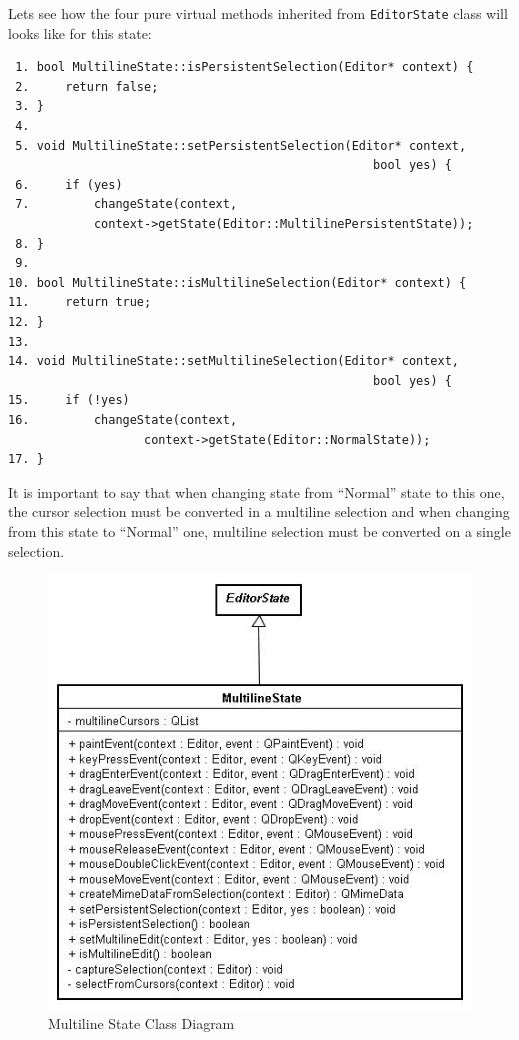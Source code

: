 \documentclass[11pt,a4paper]{report}
\begin{document}
Lets see how the four pure virtual methods inherited from \texttt{EditorState} class will looks like for this state:

\begin{verbatim}
 1. bool MultilineState::isPersistentSelection(Editor* context) {
 2.     return false;
 3. }
 4.
 5. void MultilineState::setPersistentSelection(Editor* context, 
                                                   bool yes) {
 6.     if (yes)
 7.         changeState(context, 
            context->getState(Editor::MultilinePersistentState));
 8. }
 9.
10. bool MultilineState::isMultilineSelection(Editor* context) {
11.     return true;
12. }
13.
14. void MultilineState::setMultilineSelection(Editor* context, 
                                                   bool yes) {
15.     if (!yes)
16.         changeState(context, 
                   context->getState(Editor::NormalState));
17. }
\end{verbatim}

It is important to say that when changing state from ``Normal'' state to this one, the cursor selection must be converted in a multiline selection and when changing from this state to ``Normal'' one, multiline selection must be converted on a single selection.

\begin{figure}[hbt]
\centering
\includegraphics{images/multilinestate.jpg}
\caption{Multiline State Class Diagram} \label{multilinestate}
\end{figure}
\end{document}
